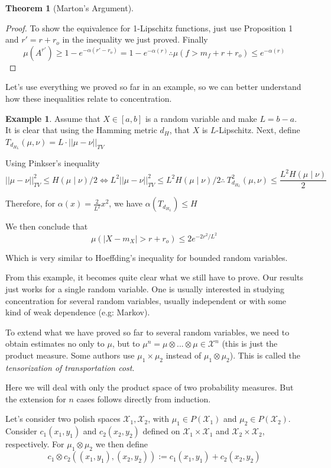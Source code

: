 \documentclass[10pt]{article}
\theoremstyle{definition}
\newtheorem{theorem}{Theorem}
\newtheorem{example}{Example}
\begin{document}
\begin{theorem}[Marton's Argument]
\begin{proof}
	To show the equivalence for 1-Lipschitz functions, just use Proposition 1 and
	$r' = r + r_o$ in the inequality we just proved. Finally
	$$
	\mu(A^{r'}) \geq 1 - e^{-\alpha(r' - r_o)} = 1 - e^{-\alpha(r)} \therefore
	\mu(f > m_f + r + r_o) \leq e^{-\alpha(r)}
	$$
\end{proof}
\end{theorem}

Let's use everything we proved so far in an example, so we can better understand how
these inequalities relate to concentration.

\begin{example}
	Assume that $X \in [a,b]$ is a random variable and make $L = b-a$. It is clear that
	using the Hamming metric $d_H$, that $X$ is $L$-Lipschitz. Next,
	define $T_{d_{H_L}}(\mu,\nu) = L \cdot || \mu - \nu||_{TV}$

	Using Pinkser's inequality
	$$
	||\mu - \nu||^2_{TV} \leq H(\mu \mid \nu)/2 \iff 
	L ^2||\mu - \nu||^2_{TV} \leq L^2 H(\mu \mid \nu)/2 \therefore \
 	T_{d_{H_L}} ^2(\mu,\nu) \leq \frac{L ^2 H(\mu \mid \nu)}{2}
	$$

	Therefore, for $\alpha(x) = \frac{2}{L^2}x^2$, we have
	$\alpha(T_{d_{H_L}}) \leq H$

	We then conclude that
	$$
	\mu(|X - m_X | > r + r_o) \leq 2 e^{- 2r^2/ L^2}
	$$

	Which is very similar to Hoeffding's inequality for bounded random variables.
\end{example}

From this example, it becomes quite clear what we still have to prove. Our results just
works for a single random variable. One is usually interested in studying concentration
for several random variables, usually independent or with some kind of weak dependence (e.g: Markov).

To extend what we have proved so far to several random variables, we need to obtain
estimates no only to $\mu$, but to $\mu^n = \mu \otimes ... \otimes \mu \in \mathcal X^n$
(this is just the product measure. Some authors use $\mu_1 \times \mu_2$ instead of
$\mu_1 \otimes \mu_2$).
This is called the \textit{tensorization of transportation cost}.

Here we will deal with only the product space of two probability measures. But the 
extension for $n$ cases follows directly from induction.

Let's consider two polish spaces $\mathcal X_1, \mathcal X_2$, with $\mu_1\in
P(\mathcal X_1)$ and $\mu_2 \in P(\mathcal X_2)$. Consider $c_1(x_1,y_1)$ and
$c_2(x_2,y_2)$ defined on
$\mathcal X_1 \times \mathcal X_1$ and
$\mathcal X_2 \times \mathcal X_2$, respectively. For $\mu_1 \otimes \mu_2$ we then
define
\begin{equation}
	c_1 \otimes c_2 ((x_1,y_1),(x_2,y_2)) := c_1(x_1,y_1)+c_2(x_2,y_2)
\end{equation}
\end{document}

